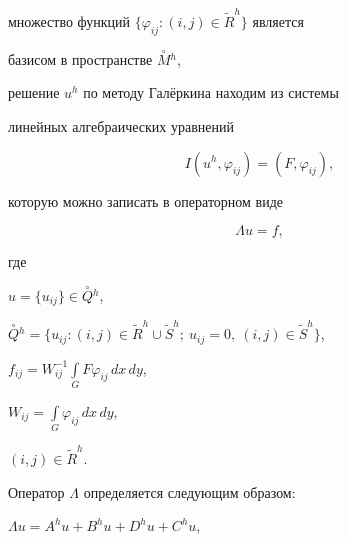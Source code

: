 множество функций $\{\varphi_{ij}:(i,j)\in\widetilde R^h\}$ является


базисом в пространстве $\overset{\circ}{M}{}^h$,


решение $u^h$ по методу Гал\"еркина находим из системы


линейных алгебраических уравнений


$$


I(u^h,\varphi_{ij})=(F,\varphi_{ij}),


$$


которую можно записать в операторном виде


\begin{equation}


\Lambda u=f,


\end{equation}


где


$u=\{u_{ij}\}\in\overset{\circ}{Q}{}^h$,


$\overset{\circ}{Q}{}^h=\{u_{ij}:(i,j)\in\widetilde R^h\cup


\widetilde S^h;\ u_{ij}=0,\ (i,j)\in\widetilde S^h\}$,


$f_{ij}=W_{ij}^{-1}\int\limits_GF\varphi_{ij}\,dx\,dy$,


$W_{ij}=\int\limits_G\varphi_{ij}\,dx\,dy$,


$(i,j)\in\widetilde R^h$.


Оператор $\Lambda$ определяется следующим образом:


$\Lambda u=A^hu+B^hu+D^hu+C^hu$,


